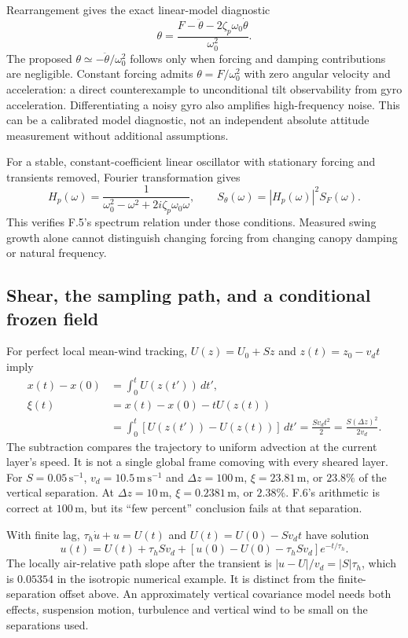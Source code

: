 Rearrangement gives the exact linear-model diagnostic
\begin{equation}
 \theta=\frac{F-\ddot\theta-2\zeta_p\omega_0\dot\theta}{\omega_0^2}.
\end{equation}
The proposed $\theta\simeq-\ddot\theta/\omega_0^2$ follows only when
forcing and damping contributions are negligible. Constant forcing admits
$\theta=F/\omega_0^2$ with zero angular velocity and acceleration: a
direct counterexample to unconditional tilt observability from gyro
acceleration. Differentiating a noisy gyro also amplifies high-frequency
noise. This can be a calibrated model diagnostic, not an independent
absolute attitude measurement without additional assumptions.

For a stable, constant-coefficient linear oscillator with stationary
forcing and transients removed, Fourier transformation gives
\begin{equation}
 H_p(\omega)=\frac{1}{\omega_0^2-\omega^2+2i\zeta_p\omega_0\omega},
 \qquad S_\theta(\omega)=|H_p(\omega)|^2S_F(\omega).
\end{equation}
This verifies F.5's spectrum relation under those conditions. Measured
swing growth alone cannot distinguish changing forcing from changing
canopy damping or natural frequency.

\subsection{Shear, the sampling path, and a conditional frozen field}

For perfect local mean-wind tracking, $U(z)=U_0+Sz$ and
$z(t)=z_0-v_dt$ imply
\begin{align}
 x(t)-x(0)&=\int_0^tU(z(t'))\,dt',\\
 \xi(t)&=x(t)-x(0)-tU(z(t))\\
 &=\int_0^t[U(z(t'))-U(z(t))]\,dt'
 =\frac{Sv_dt^2}{2}=\frac{S(\Delta z)^2}{2v_d}.
\end{align}
The subtraction compares the trajectory to uniform advection at the
current layer's speed. It is not a single global frame comoving with
every sheared layer. For $S=0.05\,\mathrm{s^{-1}}$, $v_d=10.5\,\mathrm{m\,s^{-1}}$
and $\Delta z=100\,\mathrm m$, $\xi=23.81\,\mathrm m$, or $23.8\%$
of the vertical separation. At $\Delta z=10\,\mathrm m$, $\xi=0.2381\,\mathrm m$,
or $2.38\%$. F.6's arithmetic is correct at $100\,\mathrm m$, but its
``few percent'' conclusion fails at that separation.

With finite lag, $\tau_h\dot u+u=U(t)$ and
$U(t)=U(0)-Sv_dt$ have solution
\begin{equation}
 u(t)=U(t)+\tau_hSv_d+
 [u(0)-U(0)-\tau_hSv_d]e^{-t/\tau_h}.
\end{equation}
The locally air-relative path slope after the transient is
$|u-U|/v_d=|S|\tau_h$, which is $0.05354$ in the isotropic numerical
example. It is distinct from the finite-separation offset above.
An approximately vertical covariance model needs both effects, suspension
motion, turbulence and vertical wind to be small on the separations used.

